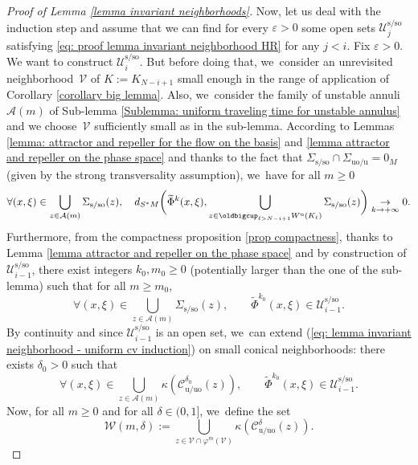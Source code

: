 \documentclass[JEP,XML,SOM,Unicode,NoEqCountersInSection,NoFloatCountersInSection,published]{cedram}
\newcommand{\rs}{\mathrm{s}}
\newcommand{\rso}{\mathrm{so}}
\newcommand{\ru}{\mathrm{u}}
\newcommand{\ruo}{\mathrm{uo}}
\theoremstyle{definition}
\theoremstyle{plain}
\newcommand{\Acal}{\mathcal{A}}
\newcommand{\Ccal}{\mathcal{C}}
\newcommand{\Ucal}{\mathcal{U}}
\newcommand{\Vcal}{\mathcal{V}}
\newcommand{\Wcal}{\mathcal{W}}
\begin{document}
\begin{proof}[Proof of Lemma \ref{lemma invariant neighborhoods}]
Now, let us deal with the induction step and assume that we can find for every $\varepsilon > 0$ some open sets $\Ucal_{j}^{\rs/\rso}$ satisfying \eqref{eq: proof lemma invariant neighborhood HR} for any $j < i$. Fix $\varepsilon > 0$. We want to construct $\Ucal_{i}^{\rs/\rso}$. But before doing that, we~consider an unrevisited neighborhood~$\Vcal$ of $K:= K_{N-i+1}$ small enough in the range of application of Corollary \ref{corollary big lemma}. Also, we~consider the family of unstable annuli $\Acal (m)$ of Sub-lemma \ref{Sublemma: uniform traveling time for unstable annulus} and we choose~$\Vcal$ sufficiently small as in the sub-lemma. According to Lemmas \ref{lemma: attractor and repeller for the flow on the basis} and \ref{lemma attractor and repeller on the phase space} and thanks to the fact that $\Sigma_{\rs/\rso}\cap \Sigma_{\ruo/\ru} = 0_M$ (given by the strong transversality assumption), we~have for all $m \geq 0$
\[
\forall (x,\xi) \in \bigcup_{z \in \Acal (m)} \Sigma_{\rs/\rso} (z), \quad d_{S^* M}\biggl(\widetilde{\Phi}^k (x,\xi), \bigcup_{z \in \oldbigcup_{\ell > N-i +1} W^\ru (K_\ell)} \Sigma_{\rs/\rso} (z) \biggr) \underset{k \to +\infty}{\to}0.
\]
Furthermore, from the compactness proposition \ref{prop compactness}, thanks to Lemma \ref{lemma attractor and repeller on the phase space} and by construction of $\Ucal_{i-1}^{\rs/\rso}$, there exist integers $k_0, m_0 \geq 0$ (potentially larger than the one of the sub-lemma) such that for all $m \geq m_0$,
\begin{equation}\label{eq: lemma invariant neighborhood - uniform cv induction}
\forall (x,\xi) \in \bigcup_{z \in \Acal (m)} \Sigma_{\rs/\rso} (z), \qquad \widetilde{\Phi}^{k_0} (x,\xi) \in \Ucal_{i-1}^{\rs/\rso}.
\end{equation}
By continuity and since $\Ucal_{i-1}^{\rs/\rso}$ is an open set, we~can extend (\ref{eq: lemma invariant neighborhood - uniform cv induction}) on small conical neighborhoods: there exists $\delta_0 > 0$ such that
\[
\forall (x,\xi) \in \bigcup_{z \in \Acal (m)} \kappa (\Ccal_{\ru/\ruo}^{\delta_0}(z)), \qquad \widetilde{\Phi}^{k_0} (x,\xi) \in \Ucal_{i-1}^{\rs/\rso}.
\]
Now, for all $m \geq 0$ and for all $\delta\in(0,1]$, we~define the set
\[
\Wcal (m,\delta):= \bigcup_{z \in \Vcal \cap \varphi^m (\Vcal)} \kappa (\Ccal_{\ru/\ruo}^{\delta}(z)).
\]


\end{proof}
\end{document}
